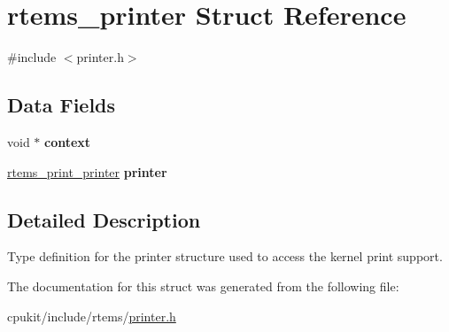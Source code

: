 \hypertarget{structrtems__printer}{}\section{rtems\+\_\+printer Struct Reference}
\label{structrtems__printer}


{\ttfamily \#include $<$printer.\+h$>$}

\subsection*{Data Fields}
\begin{DoxyCompactItemize}
\item 
\mbox{\label{structrtems__printer_aee8572e18b65f02a66a8ae94527579a8}} 
void $\ast$ {\bfseries context}
\item 
\mbox{\label{structrtems__printer_a69e4c5e755f40514e9ca3e9603a37b9c}} 
\mbox{\hyperlink{group__RTEMSPrintSupport_ga1a1d078f9f2a229f68b017e3c21ded61}{rtems\+\_\+print\+\_\+printer}} {\bfseries printer}
\end{DoxyCompactItemize}


\subsection{Detailed Description}
Type definition for the printer structure used to access the kernel print support. 

The documentation for this struct was generated from the following file\+:\begin{DoxyCompactItemize}
\item 
cpukit/include/rtems/\mbox{\hyperlink{printer_8h}{printer.\+h}}\end{DoxyCompactItemize}

